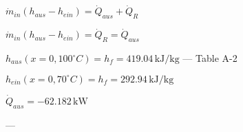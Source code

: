 \( \dot{m}_{in} (h_{aus} - h_{ein}) = \dot{Q}_{aus} + \dot{Q}_R \)  

\( \dot{m}_{in} (h_{aus} - h_{ein}) = \dot{Q}_R = \dot{Q}_{aus} \)  

\( h_{aus} (x = 0, 100^\circ C) = h_f = 419.04 \, \text{kJ/kg} \) — Table A-2  

\( h_{ein} (x = 0, 70^\circ C) = h_f = 292.94 \, \text{kJ/kg} \)  

\( \dot{Q}_{aus} = -62.182 \, \text{kW} \)  

---